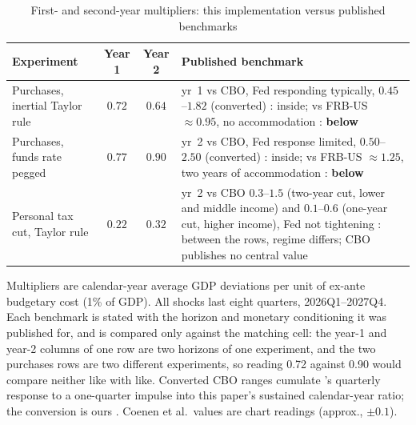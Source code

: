 \begin{table}[htbp]
\centering
\caption{First- and second-year multipliers: this implementation versus published benchmarks}
\label{tab:multipliers}
\footnotesize
\begin{tabularx}{\textwidth}{lcc>{\raggedright\arraybackslash}X}
\toprule
Experiment & Year 1 & Year 2 & Published benchmark \\
\midrule
Purchases, inertial Taylor rule & $0.72$ & $0.64$ & yr~1 vs CBO, Fed responding typically, $0.45$--$1.82$ (converted) \citep{whalen2015fiscal}: inside; vs FRB-US $\approx0.95$, no accommodation \citep[Fig.~25]{coenen2012effects}: \textbf{below} \\
Purchases, funds rate pegged & $0.77$ & $0.90$ & yr~2 vs CBO, Fed response limited, $0.50$--$2.50$ (converted) \citep{whalen2015fiscal}: inside; vs FRB-US $\approx1.25$, two years of accommodation \citep[Fig.~25]{coenen2012effects}: \textbf{below} \\
Personal tax cut, Taylor rule & $0.22$ & $0.32$ & yr~2 vs CBO $0.3$--$1.5$ (two-year cut, lower and middle income) and $0.1$--$0.6$ (one-year cut, higher income), Fed not tightening \citep[Table~3]{cbo2015arra}: between the rows, regime differs; CBO publishes no central value \\
\bottomrule
\end{tabularx}

\medskip
\parbox{0.95\textwidth}{\footnotesize Multipliers are calendar-year average GDP deviations per unit of ex-ante budgetary cost (1\% of GDP). All shocks last eight quarters, 2026Q1--2027Q4. Each benchmark is stated with the horizon and monetary conditioning it was published for, and is compared only against the matching cell: the year-1 and year-2 columns of one row are two horizons of one experiment, and the two purchases rows are two different experiments, so reading 0.72 against 0.90 would compare neither like with like. Converted CBO ranges cumulate \citet[Table~2]{whalen2015fiscal}'s quarterly response to a one-quarter impulse into this paper's sustained calendar-year ratio; the conversion is ours \citep{frbbenchmarks2026}. Coenen et al.\ values are chart readings (approx., $\pm0.1$).}
\end{table}
